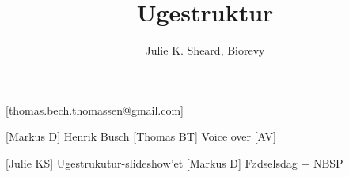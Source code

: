 \documentclass[a4paper,12pt]{article}
\title{Ugestruktur}
\author{Julie K. Sheard, Biorevy}
\begin{document}
\maketitle

\begin{texxers}
	[thomas.bech.thomassen@gmail.com]
\end{texxers}

\begin{roles}
	[Markus D] Henrik Busch
	[Thomas BT] Voice over
        [AV]
\end{roles}


\begin{props}
	[Julie KS] Ugestrukutur-slideshow'et
	[Markus D] Fødselsdag + NBSP
\end{props}
\end{document}
